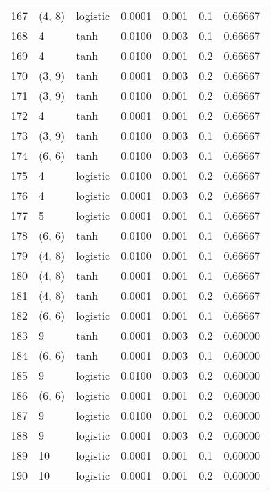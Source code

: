 \begin{tabular}{lllrrrr}
167 &      (4, 8) &  logistic &  0.0001 &  0.001 &  0.1 &   0.66667 \\
168 &           4 &      tanh &  0.0100 &  0.003 &  0.1 &   0.66667 \\
169 &           4 &      tanh &  0.0100 &  0.001 &  0.2 &   0.66667 \\
170 &      (3, 9) &      tanh &  0.0001 &  0.003 &  0.2 &   0.66667 \\
171 &      (3, 9) &      tanh &  0.0100 &  0.001 &  0.2 &   0.66667 \\
172 &           4 &      tanh &  0.0001 &  0.001 &  0.2 &   0.66667 \\
173 &      (3, 9) &      tanh &  0.0100 &  0.003 &  0.1 &   0.66667 \\
174 &      (6, 6) &      tanh &  0.0100 &  0.003 &  0.1 &   0.66667 \\
175 &           4 &  logistic &  0.0100 &  0.001 &  0.2 &   0.66667 \\
176 &           4 &  logistic &  0.0001 &  0.003 &  0.2 &   0.66667 \\
177 &           5 &  logistic &  0.0001 &  0.001 &  0.1 &   0.66667 \\
178 &      (6, 6) &      tanh &  0.0100 &  0.001 &  0.1 &   0.66667 \\
179 &      (4, 8) &  logistic &  0.0100 &  0.001 &  0.1 &   0.66667 \\
180 &      (4, 8) &      tanh &  0.0001 &  0.001 &  0.1 &   0.66667 \\
181 &      (4, 8) &      tanh &  0.0001 &  0.001 &  0.2 &   0.66667 \\
182 &      (6, 6) &  logistic &  0.0001 &  0.001 &  0.1 &   0.66667 \\
183 &           9 &      tanh &  0.0001 &  0.003 &  0.2 &   0.60000 \\
184 &      (6, 6) &      tanh &  0.0001 &  0.003 &  0.1 &   0.60000 \\
185 &           9 &  logistic &  0.0100 &  0.003 &  0.2 &   0.60000 \\
186 &      (6, 6) &  logistic &  0.0001 &  0.001 &  0.2 &   0.60000 \\
187 &           9 &  logistic &  0.0100 &  0.001 &  0.2 &   0.60000 \\
188 &           9 &  logistic &  0.0001 &  0.003 &  0.2 &   0.60000 \\
189 &          10 &  logistic &  0.0001 &  0.001 &  0.1 &   0.60000 \\
190 &          10 &  logistic &  0.0001 &  0.001 &  0.2 &   0.60000 \\

\end{tabular}
